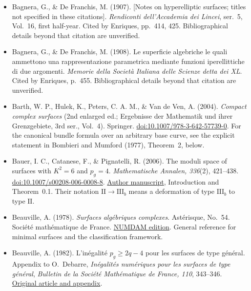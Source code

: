 \begin{sloppypar}
\begin{itemize}
\item Bagnera, G., \& De Franchis, M. (1907). [Notes on hyperelliptic surfaces; titles not specified in these citations]. \emph{Rendiconti dell'Accademia dei Lincei}, ser.~5, Vol.~16, first half-year. Cited by Enriques, pp.~414, 425. Bibliographical details beyond that citation are unverified.

\item Bagnera, G., \& De Franchis, M. (1908). Le superficie algebriche le quali ammettono una rappresentazione parametrica mediante funzioni iperellittiche di due argomenti. \emph{Memorie della Società Italiana delle Scienze detta dei XL}. Cited by Enriques, p.~455. Bibliographical details beyond that citation are unverified.

\item Barth, W. P., Hulek, K., Peters, C. A. M., \& Van de Ven, A. (2004). \emph{Compact complex surfaces} (2nd enlarged ed.; Ergebnisse der Mathematik und ihrer Grenzgebiete, 3rd ser., Vol.~4). Springer. \href{https://doi.org/10.1007/978-3-642-57739-0}{doi:10.1007/978-3-642-57739-0}. For the canonical bundle formula over an arbitrary base curve, see the explicit statement in Bombieri and Mumford (1977), Theorem~2, below.

\item Bauer, I. C., Catanese, F., \& Pignatelli, R. (2006). The moduli space of surfaces with $K^2=6$ and $p_g=4$. \emph{Mathematische Annalen, 336}(2), 421--438. \href{https://doi.org/10.1007/s00208-006-0008-8}{doi:10.1007/s00208-006-0008-8}. \href{https://pignatelli.maths.unitn.it/papers/k26pg4.pdf}{Author manuscript}, Introduction and Theorem~0.1. Their notation $\mathrm{II}\to\mathrm{III}_b$ means a deformation of type $\mathrm{III}_b$ to type $\mathrm{II}$.

\item Beauville, A. (1978). \emph{Surfaces algébriques complexes}. Astérisque, No.~54. Société mathématique de France. \href{https://numdam.org/item/AST_1978__54__R1_0/}{NUMDAM edition}. General reference for minimal surfaces and the classification framework.

\item Beauville, A. (1982). L'inégalité $p_g\geq 2q-4$ pour les surfaces de type général. Appendix to O.~Debarre, \emph{Inégalités numériques pour les surfaces de type général}, \emph{Bulletin de la Société Mathématique de France, 110}, 343--346. \href{https://www.numdam.org/article/BSMF_1982__110__319_0.pdf}{Original article and appendix}.


\end{itemize}
\end{sloppypar}
